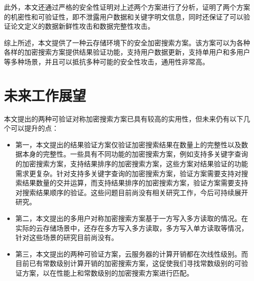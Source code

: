 此外，本文还通过严格的安全性证明对上述两个方案进行了分析，证明了两个方案的机密性和可验证性，即不泄露用户数据和关键字明文信息，同时还保证了可以验证论文定义的数据新鲜性攻击和数据完整性攻击。

综上所述，本文提供了一种云存储环境下的安全加密搜索方案。该方案可以为各种各样的加密搜索方案提供结果验证功能，支持用户数据更新，支持单用户和多用户等多种场景，并且可以抵抗多种可能的安全性攻击，通用性非常高。

\section{未来工作展望}
本文提出的两种可验证对称加密搜索方案已具有较高的实用性，但未来仍有以下几个可以提升的点：
\begin{itemize}
  \item 第一，本文提出的结果验证方案仅验证加密搜索结果在数量上的完整性以及数据本身的完整性。一些具有不同功能的加密搜索方案，例如支持多关键字查询的加密搜索方案，支持结果排序的加密搜索方案，这些方案对结果验证的功能需求更复杂。针对支持多关键字查询的加密搜索方案，验证方案需要支持对搜索结果数量的交并运算，而支持结果排序的加密搜索方案，验证方案需要支持对搜索结果顺序的验证。这些问题目前尚没有相关研究工作，今后可持续展开研究。
  \item 第二，本文提出的多用户对称加密搜索方案\multi 基于一方写入多方读取的情况。在实际的云存储场景中，还存在多方写入多方读取，多方写入单方读取等情况，针对这些场景的研究目前尚没有。
  \item 第三，本文提出的两种可验证方案，云服务器的计算开销都在次线性级别。而目前已有常数级别计算开销的加密搜索方案，这促使我们寻找常数级别的可验证方案，以在性能上和常数级别的加密搜索方案进行匹配。
\end{itemize}
